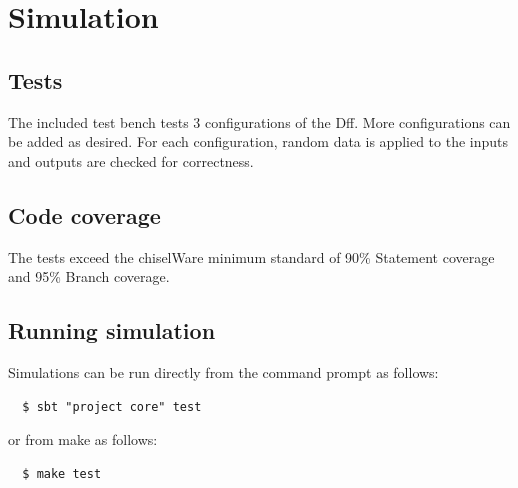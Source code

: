 \section{Simulation}

\subsection{Tests}
The included test bench tests 3 configurations of the Dff. More configurations can be added as desired. For each configuration,
random data is applied to the inputs and outputs are checked for correctness.

\subsection{Code coverage}

The tests exceed the chiselWare minimum standard of 90\% Statement coverage
and 95\% Branch coverage.

\subsection{Running simulation}

Simulations can be run directly from the command prompt as follows:

\begin{verbatim}
  $ sbt "project core" test
\end{verbatim}

or from make as follows:

\begin{verbatim}
  $ make test
\end{verbatim}
